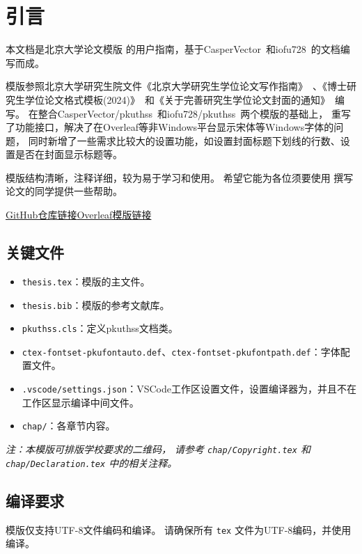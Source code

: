 \chapter{引言}
\label{chap:intro}

\def\GitHubLink{\href{https://github.com/zhiyunyao/pkuthss/tree/lite}{GitHub仓库链接}}
\def\OverleafLink{\href{https://www.overleaf.com/read/wmsmytgjkxfy\#c888f2}{Overleaf模版链接}}

本文档是北京大学论文模版 \pkuthss{} 的用户指南，基于CasperVector~\cite{casperpkuthss2011}和iofu728~\cite{iofu728pkuthss2021}的文档编写而成。

\pkuthss{}模版参照北京大学研究生院文件《北京大学研究生学位论文写作指南》~\cite{pku-thesisguide}、《博士研究生学位论文格式模板(2024)》~\cite{pku-thesisstyle}和《关于完善研究生学位论文封面的通知》~\cite{pku-thesiscover}编写。
在整合CasperVector/pkuthss~\cite{casperpkuthss2011}和iofu728/pkuthss~\cite{iofu728pkuthss2021}两个模版的基础上，
重写了功能接口，解决了在Overleaf等非Windows平台显示宋体等Windows字体的问题，
同时新增了一些需求比较大的设置功能，如设置封面标题下划线的行数、设置是否在封面显示标题等。

\pkuthss{}模版结构清晰，注释详细，较为易于学习和使用。
希望它能为各位须要使用  撰写论文的同学提供一些帮助。

\GitHubLink \quad \OverleafLink

\section{关键文件}
\begin{itemize}
    \item \verb|thesis.tex|：模版的主文件。
    \item \verb|thesis.bib|：模版的参考文献库。
    \item \verb|pkuthss.cls|：定义pkuthss文档类。
    \item \verb|ctex-fontset-pkufontauto.def|、\verb|ctex-fontset-pkufontpath.def|：字体配置文件。
    \item \verb|.vscode/settings.json|：VSCode工作区设置文件，设置编译器为，并且不在工作区显示编译中间文件。
    \item \verb|chap/|：各章节内容。
\end{itemize}
\emph{
    注：本模版可排版学校要求的二维码，
    请参考 \texttt{chap/Copyright.tex} 和 \texttt{chap/Declaration.tex} 中的相关注释。
}

\section{编译要求}
\pkuthss{}模版仅支持UTF-8文件编码和编译。
请确保所有 \verb|tex| 文件为UTF-8编码，并使用编译。

